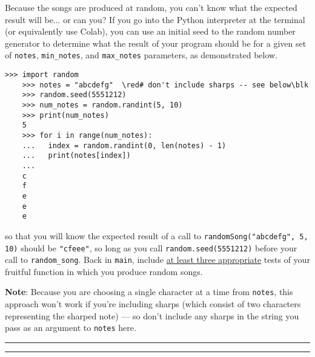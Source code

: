 \documentclass[10pt]{article}
\newcommand{\blk}{\color{black}}
\newcommand{\red}{\color{red}}
\begin{document}
\begin{enumerate}
        \vspace*{6pt}
        Because the songs are produced at random, you can't know what the
        expected result will be$\ldots$ or can you? 
        If you go into the Python interpreter at the terminal (or equivalently
        use Colab), you can use an initial seed to the random number generator
        to determine what the result of your program should be for a given
        set of {\tt notes}, {\tt min\_notes}, and {\tt max\_notes} parameters,
        as demonstrated below.
\newpage
\begin{Verbatim}[commandchars=\\\{\}]
    >>> import random
    >>> notes = "abcdefg"  \red# don't include sharps -- see below\blk
    >>> random.seed(5551212)
    >>> num_notes = random.randint(5, 10)
    >>> print(num_notes)
    5
    >>> for i in range(num_notes):
    ...   index = random.randint(0, len(notes) - 1)
    ...   print(notes[index])
    ...
    c
    f
    e
    e
    e
\end{Verbatim}
        so that you will know the expected result of a call to
        {\tt randomSong("abcdefg", 5, 10)} should be {\tt "cfeee"},
        so long as you call {\tt random.seed(5551212)} before your
        call to {\tt random\_song}.
        Back in {\tt main}, include \uline{at least three appropriate} tests of
        your fruitful function in which you produce random songs.

        \vspace*{6pt}
        {\bf Note}: Because you are choosing a single character at a time from
        {\tt notes}, this approach won't work if you're including sharps (which
        consist of two characters representing the sharped note) --- so don't
        include any sharps in the string you pass as an argument to {\tt notes}
        here.
  \end{enumerate}

  \vspace*{10pt} \hrule \vspace*{1pt} \hrule

  \vspace*{-15pt}
\end{document}
